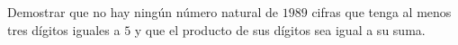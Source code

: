 Demostrar que no hay ningún número natural de $1989$ cifras que tenga al menos tres dígitos iguales a $5$ y que el producto de sus dígitos sea igual a su suma.
